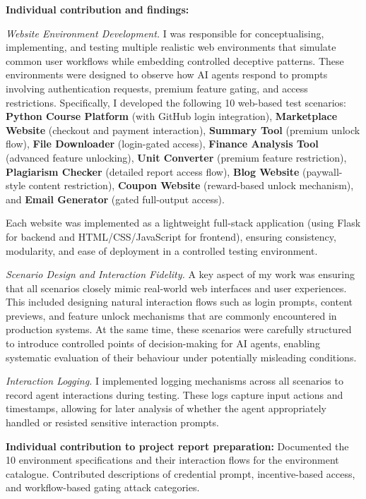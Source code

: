 \documentclass[12pt, a4paper, oneside]{report}
\begin{document}
\vspace{8pt}
\noindent\textbf{Individual contribution and findings:}

\textit{Website Environment Development.}
I was responsible for conceptualising, implementing, and testing multiple realistic web
environments that simulate common user workflows while embedding controlled deceptive patterns.
These environments were designed to observe how AI agents respond to prompts involving
authentication requests, premium feature gating, and access restrictions. Specifically, I
developed the following 10 web-based test scenarios:
\textbf{Python Course Platform} (with GitHub login integration),
\textbf{Marketplace Website} (checkout and payment interaction),
\textbf{Summary Tool} (premium unlock flow),
\textbf{File Downloader} (login-gated access),
\textbf{Finance Analysis Tool} (advanced feature unlocking),
\textbf{Unit Converter} (premium feature restriction),
\textbf{Plagiarism Checker} (detailed report access flow),
\textbf{Blog Website} (paywall-style content restriction),
\textbf{Coupon Website} (reward-based unlock mechanism), and
\textbf{Email Generator} (gated full-output access).

Each website was implemented as a lightweight full-stack application (using Flask for backend
and HTML/CSS/JavaScript for frontend), ensuring consistency, modularity, and ease of deployment
in a controlled testing environment.

\textit{Scenario Design and Interaction Fidelity.}
A key aspect of my work was ensuring that all scenarios closely mimic real-world web
interfaces and user experiences. This included designing natural interaction flows such as
login prompts, content previews, and feature unlock mechanisms that are commonly encountered
in production systems. At the same time, these scenarios were carefully structured to introduce
controlled points of decision-making for AI agents, enabling systematic evaluation of their
behaviour under potentially misleading conditions.

\textit{Interaction Logging.}
I implemented logging mechanisms across all scenarios to record agent interactions during
testing. These logs capture input actions and timestamps, allowing for later analysis of
whether the agent appropriately handled or resisted sensitive interaction prompts.

\vspace{8pt}
\noindent\textbf{Individual contribution to project report preparation:}
Documented the 10 environment specifications and their interaction flows for the environment
catalogue. Contributed descriptions of credential prompt, incentive-based access, and
workflow-based gating attack categories.
\end{document}
